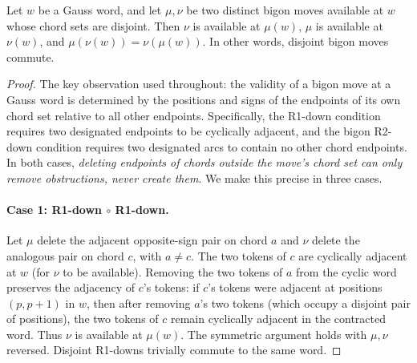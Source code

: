 
\begin{lemma}\label{lem:del-mon}
Let $w$ be a Gauss word, and let $\mu, \nu$ be two distinct
bigon moves available at $w$ whose chord sets are disjoint.
Then $\nu$ is available at $\mu(w)$, $\mu$ is available at
$\nu(w)$, and $\mu(\nu(w))=\nu(\mu(w))$.
In other words, disjoint bigon moves commute.
\end{lemma}

\begin{proof}
The key observation used throughout: the validity of a bigon move at a
Gauss word is determined by the positions and signs of the endpoints
of its own chord set relative to all other endpoints. Specifically,
the R1-down condition requires two designated endpoints to be
cyclically adjacent, and the bigon R2-down condition requires two
designated arcs to contain no other chord endpoints. In both cases,
\emph{deleting endpoints of chords outside the move's chord set can
only remove obstructions, never create them}. We make this precise in
three cases.

\paragraph{Case 1: R1-down $\circ$ R1-down.}
Let $\mu$ delete the adjacent opposite-sign pair on chord $a$ and
$\nu$ delete the analogous pair on chord $c$, with $a\neq c$.
The two tokens of $c$ are cyclically adjacent at $w$ (for $\nu$ to be
available). Removing the two tokens of $a$ from the cyclic word
preserves the adjacency of $c$'s tokens: if $c$'s tokens were adjacent
at positions $(p, p+1)$ in $w$, then after removing $a$'s two tokens
(which occupy a disjoint pair of positions), the two tokens of $c$
remain cyclically adjacent in the contracted word. Thus $\nu$ is
available at $\mu(w)$. The symmetric argument holds with $\mu, \nu$
reversed. Disjoint R1-downs trivially commute to the same word.


\end{proof}
